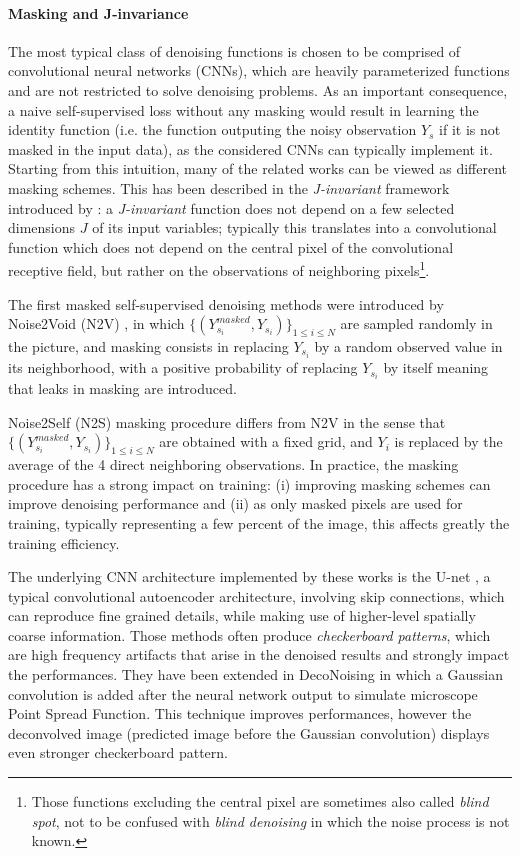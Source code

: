 \documentclass[lettersize,journal]{IEEEtran}
\begin{document}
\paragraph{Masking and J-invariance}
The most typical class of denoising functions is chosen to be comprised of convolutional neural networks (CNNs), which are heavily parameterized functions and are not restricted to solve denoising problems. As an important consequence, a naive self-supervised loss without any masking would result in learning the identity function (i.e. the function outputing the noisy observation $Y_s$ if it is not masked in the input data), as the considered CNNs can typically implement it. Starting from this intuition, many of the related works can be viewed as different masking schemes. This has been described in the \textit{J-invariant} framework introduced by \cite{batson2019noise2self}: a \textit{J-invariant} function does not depend on a few selected dimensions $J$ of its input variables; typically this translates into a convolutional function which does not depend on the central pixel of the convolutional receptive field, but rather on the observations of neighboring pixels\footnote{Those functions excluding the central pixel are sometimes also called \textit{blind spot}, not to be confused with \textit{blind denoising} in which the noise process is not known.}.

The first masked self-supervised denoising methods were introduced by Noise2Void (N2V) \cite{krull2018noise2void}, in which $\{(Y^{masked}_{s_i},Y_{s_i})\}_{1\leqslant i\leqslant N}$ are sampled randomly in the picture, and masking consists in replacing $Y_{s_i}$ by a random observed value in its neighborhood, with a positive probability of replacing $Y_{s_i}$ by itself meaning that leaks in masking are introduced.

Noise2Self (N2S) \cite{batson2019noise2self} masking procedure differs from N2V in the sense that $\{(Y^{masked}_{s_i},Y_{s_i})\}_{1\leqslant i\leqslant N}$ are obtained with a fixed grid, and $Y_i$ is replaced by the average of the 4 direct neighboring observations.
In practice, the masking procedure has a strong impact on training: (i) improving masking schemes can improve denoising performance and (ii) as only masked pixels are used for training, typically representing a few percent of the image, this affects greatly the training efficiency.

The underlying CNN architecture implemented by these works is the U-net \cite{ronneberger2015u}, a typical convolutional autoencoder architecture, involving skip connections, which can reproduce fine grained details, while making use of higher-level spatially coarse information.
Those methods often produce \textit{checkerboard patterns}, which are high frequency artifacts that arise in the denoised results and strongly impact the performances.
They have been extended in DecoNoising \cite{goncharova2020} in which a Gaussian convolution is added after the neural network output to simulate microscope Point Spread Function.
This technique improves performances, however the deconvolved image (predicted image before the Gaussian convolution) displays even stronger checkerboard pattern.
\end{document}
